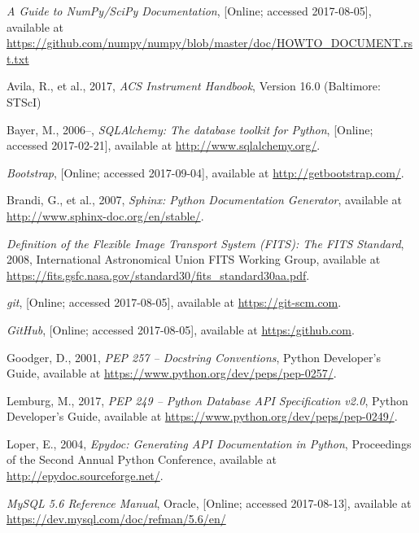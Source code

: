 \documentclass[10pt,journal,compsoc]{IEEEtran}
\begin{document}
\ifCLASSOPTIONcaptionsoff
  \newpage
\fi


\begin{thebibliography}{1}

\emph{A Guide to NumPy/SciPy Documentation}, [Online; accessed 2017-08-05], available at
\url{https://github.com/numpy/numpy/blob/master/doc/HOWTO_DOCUMENT.rst.txt}

Avila, R., et al., 2017, \emph{ACS Instrument Handbook}, Version 16.0 (Baltimore: STScI)

Bayer, M., 2006–, \emph{SQLAlchemy: The database toolkit for Python}, [Online; accessed 2017-02-21],
available at \url{http://www.sqlalchemy.org/}.

\emph{Bootstrap}, [Online; accessed 2017-09-04], available at \url{http://getbootstrap.com/}.

Brandi, G., et al., 2007, \emph{Sphinx: Python Documentation Generator}, available at
\url{http://www.sphinx-doc.org/en/stable/}.

\emph{Definition of the Flexible Image Transport System (FITS): The FITS Standard}, 2008,
International Astronomical Union FITS Working Group, available at
\url{https://fits.gsfc.nasa.gov/standard30/fits_standard30aa.pdf}.

\emph{git}, [Online; accessed 2017-08-05], available at \url{https://git-scm.com}.

\emph{GitHub}, [Online; accessed 2017-08-05], available at \url{https:/github.com}.

Goodger, D., 2001, \emph{PEP 257 -- Docstring Conventions}, Python Developer's Guide,
available at \url{https://www.python.org/dev/peps/pep-0257/}.

Lemburg, M., 2017, \emph{PEP 249 -- Python Database API Specification v2.0}, Python Developer's Guide,
available at \url{https://www.python.org/dev/peps/pep-0249/}.

Loper, E., 2004, \emph{Epydoc: Generating API Documentation in Python}, Proceedings of the
Second Annual Python Conference, available at \url{http://epydoc.sourceforge.net/}.

\emph{MySQL 5.6 Reference Manual}, Oracle, [Online; accessed 2017-08-13], available at
\url{https://dev.mysql.com/doc/refman/5.6/en/}


\end{thebibliography}
\end{document}
